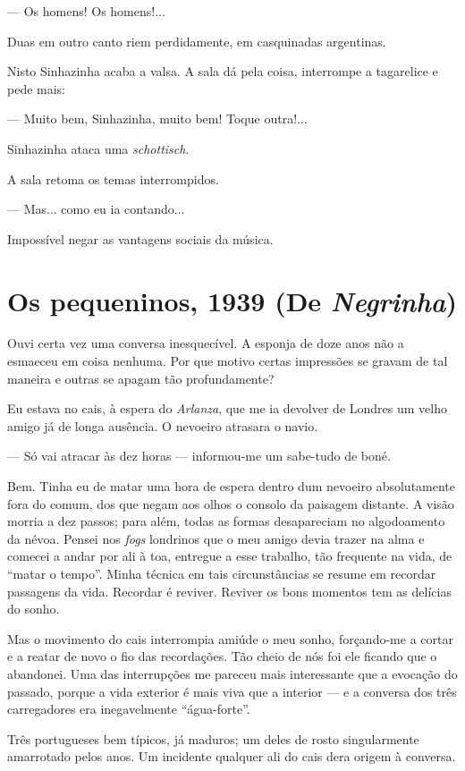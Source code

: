 --- Os homens! Os homens!...

Duas em outro canto riem perdidamente, em casquinadas argentinas.

Nisto Sinhazinha acaba a valsa. A sala dá pela coisa, interrompe a
tagarelice e pede mais:

--- Muito bem, Sinhazinha, muito bem! Toque outra!...

Sinhazinha ataca uma \emph{schottisch}.

A sala retoma os temas interrompidos.

--- Mas... como eu ia contando...

Impossível negar as vantagens sociais da música.

\chapter{Os pequeninos, 1939 (De \emph{Negrinha})}

Ouvi certa vez uma conversa inesquecível. A esponja de doze anos não a
esmaeceu em coisa nenhuma. Por que motivo certas impressões se gravam de
tal maneira e outras se apagam tão profundamente?

Eu estava no cais, à espera do \emph{Arlanza}, que me ia devolver de
Londres um velho amigo já de longa ausência. O nevoeiro atrasara o
navio.

--- Só vai atracar às dez horas --- informou-me um sabe-tudo de boné.

Bem. Tinha eu de matar uma hora de espera dentro dum nevoeiro
absolutamente fora do comum, dos que negam aos olhos o consolo da
paisagem distante. A visão morria a dez passos; para além, todas as
formas desapareciam no algodoamento da névoa. Pensei nos \emph{fogs}
londrinos que o meu amigo devia trazer na alma e comecei a andar por ali
à toa, entregue a esse trabalho, tão frequente na vida, de ``matar o
tempo''. Minha técnica em tais circunstâncias se resume em recordar
passagens da vida. Recordar é reviver. Reviver os bons momentos tem as
delícias do sonho.

Mas o movimento do cais interrompia amiúde o meu sonho, forçando-me a
cortar e a reatar de novo o fio das recordações. Tão cheio de nós foi
ele ficando que o abandonei. Uma das interrupções me pareceu mais
interessante que a evocação do passado, porque a vida exterior é mais
viva que a interior --- e a conversa dos três carregadores era
inegavelmente ``água-forte''.

Três portugueses bem típicos, já maduros; um deles de rosto
singularmente amarrotado pelos anos. Um incidente qualquer ali do cais
dera origem à conversa.

